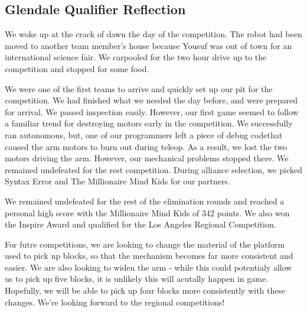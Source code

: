\newpage \subsection{Glendale Qualifier Reflection}
We woke up at the crack of dawn the day of the competition. The robot had been moved to another team member’s house because Yousuf was out of town for an international science fair. We carpooled for the two hour drive up to the competition and stopped for some food. 

We were one of the first teams to arrive and quickly set up our pit for the competition. We had finished what we needed the day before, and were prepared for arrival. We passed inspection easily. However, our first game seemed to follow a familiar trend for destroying motors early in the competition. We successfully ran autonomous, but, one of our programmers left a piece of debug codethat caused the arm motors to burn out during teleop. As a result, we lost the two motors driving the arm. However, our mechanical problems stopped there. We remained undefeated for the rest competition. During alliance selection, we picked Syntax Error and The Millionaire Mind Kids for our partners. 

We remained undefeated for the rest of the elimination rounds and reached a personal high score with the Millionaire Mind Kids of 342 points. We also won the Inspire Award and qualified for the Los Angeles Regional Competition.

For futre competitions, we are looking to change the material of the platform used to pick up blocks, so that the mechanism becomes far more consistent and easier. We are also looking to widen the arm - while this could potentialy allow us to pick up five blocks, it is unlikely this will acutally happen in game. Hopefully, we will be able to pick up four blocks more consistently with these changes. We're looking forward to the regional competitions!